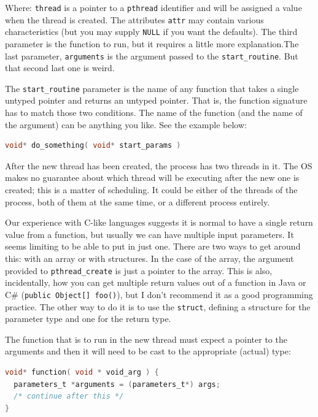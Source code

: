 \documentclass[a4paper]{report}
\begin{document}
\begin{appendices}
Where: \texttt{thread} is a pointer to a \texttt{pthread} identifier and will be assigned a value when the thread is created. The attributes \texttt{attr} may contain various characteristics (but you may supply \texttt{NULL} if you want the defaults). The third parameter is the function to run, but it requires a little more explanation.The last parameter, \texttt{arguments} is the argument passed to the \texttt{start\_routine}. But that second last one is weird.

The \texttt{start\_routine} parameter is the name of any function that takes a single untyped pointer and returns an untyped pointer. That is, the function signature has to match those two conditions. The name of the function (and the name of the argument) can be anything you like. See the example below: 

\begin{lstlisting}[language=C]
void* do_something( void* start_params )
\end{lstlisting}


After the new thread has been created, the process has two threads in it. The OS makes no guarantee about which thread will be executing after the new one is created; this is a matter of scheduling. It could be either of the threads of the process, both of them at the same time, or a different process entirely.

Our experience with C-like languages suggests it is normal to have a single return value from a function, but usually we can have multiple input parameters. It seems limiting to be able to put in just one. There are two ways to get around this: with an array or with structures. In the case of the array, the argument provided to \texttt{pthread\_create} is just a pointer to the array. This is also, incidentally, how you can get multiple return values out of a function in Java or C\# (\texttt{public Object[] foo()}), but I don't recommend it as a good programming practice. The other way to do it is to use the \texttt{struct}, defining a structure for the parameter type and one for the return type. 

The function that is to run in the new thread must expect a pointer to the arguments and then it will need to be cast to the appropriate (actual) type:
\begin{lstlisting}[language=C]
void* function( void * void_arg ) {
  parameters_t *arguments = (parameters_t*) args;
  /* continue after this */
}
\end{lstlisting}


\end{appendices}
\end{document}
